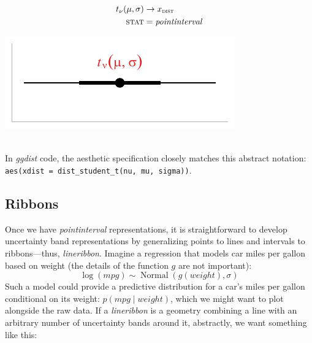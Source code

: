 \documentclass[journal]{vgtc}                     %
\newenvironment{centerverbatim}{%
\setlength{\parskip}{.4\belowdisplayskip}%
\vspace{.55\abovedisplayskip}%
\noindent%
\small%
\centering%
\varwidth{\linewidth}%
\verbatim
}{%
\endverbatim%
\endvarwidth%
\par%
\hfill\break%
}
\newcommand{\equationfigure}[2]{%
\noindent
\begin{minipage}{.5\columnwidth}
\setlength{\abovedisplayskip}{0pt}
\setlength{\belowdisplayskip}{0pt}
#1\end{minipage}%
\begin{minipage}{.4\columnwidth}\centering #2 \end{minipage}%
\vspace{.5\belowdisplayskip}\\
}
\begin{document}
\equationfigure{
\begin{align*}
t_{\nu}(\mu, \sigma) &\rightarrow x_\textsc{dist}\\
\textsc{stat} &= \mathit{pointinterval}
\end{align*}
}{\includegraphics[width=1.2\columnwidth]{figs/3-stat_pointinterval_student_t.pdf}}
In \textit{ggdist} code, the aesthetic specification closely matches this abstract notation: \verb|aes(xdist = dist_student_t(nu, mu, sigma))|.


\subsection{Ribbons}

Once we have \textit{pointinterval} representations, it is straightforward to develop uncertainty band representations by generalizing points to lines and intervals to ribbons---thus, \textit{lineribbon}. Imagine a regression that models car miles per gallon based on weight (the details of the function $g$ are not important):
\[
\log(\mathit{mpg}) \sim \operatorname{Normal}\left(g(\mathit{weight}), \sigma\right)
\]
Such a model could provide a predictive distribution for a car's miles per gallon conditional on its weight: $p(\mathit{mpg} \mid \mathit{weight})$, which we might want to plot alongside the raw data. If a \textit{lineribbon} is a geometry combining a line with an arbitrary number of uncertainty bands around it, abstractly, we want something like this:
\end{document}
